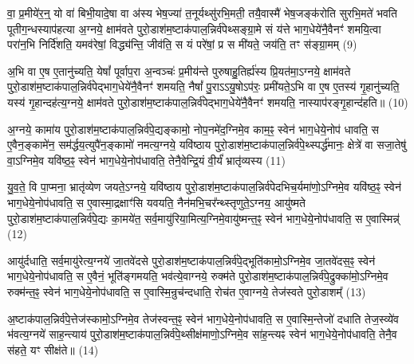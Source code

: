 वा॒ प्र॒मीये॑र॒न्॒ यो वा॑ बिभी॒यादे॒षा वा अ॑स्य भेष॒ज्या॑ त॒नूर्यथ्सु॑रभि॒मती॒ तयै॒वास्मै॑ भेष॒जङ्क॑रोति सुरभि॒मते॑ भवति पूतीग॒न्धस्याप॑हत्या अ॒ग्नये॒ क्षाम॑वते पुरो॒डाश॑म॒ष्टाक॑पाल॒न्निर्व॑पेथ्सङ्ग्रा॒मे सं य॑त्ते भाग॒धेये॑नै॒वैनꣳ॑ शमयि॒त्वा परा॑न॒भि निर्दि॑शति॒ यमव॑रेषां॒ विद्ध्य॑न्ति॒ जीव॑ति॒ स यं परे॑षां॒ प्र स मी॑यते॒ जय॑ति॒ तꣳ स॑ङ्ग्रा॒मम् (9)

अ॒भि वा ए॒ष ए॒तानु॑च्यति॒ येषां᳚ पूर्वाप॒रा अ॒न्वञ्चः॑ प्र॒मीय॑न्ते पुरुषाहु॒तिर्ह्य॑स्य प्रि॒यत॑मा॒\-ऽग्नये॒ क्षाम॑वते पुरो॒डाश॑म॒ष्टाक॑पाल॒न्निर्व॑पेद्भाग॒धेये॑नै॒वैनꣳ॑ शमयति॒ नैषां᳚ पु॒रा\-ऽ\-ऽयु॒षो\-ऽप॑रः॒ प्रमी॑यते॒\-ऽभि वा ए॒ष ए॒तस्य॑ गृ॒हानु॑च्यति॒ यस्य॑ गृ॒हान्दह॑त्य॒ग्नये॒ क्षाम॑वते पुरो॒डाश॑म॒ष्टाक॑पाल॒न्निर्व॑पेद्भाग॒धेये॑नै॒वैनꣳ॑ शमयति॒ नास्याप॑रङ्गृ॒हान्द॑हति॥ (10)

{\anuvakamend[{व्र॒तप॑तये॒ निशि॑ताया॒न्निर्व॑पे॒त्पुरु॑षाः सङ्ग्रा॒मन्न च॒त्वारि॑ च॥२॥}]}

अ॒ग्नये॒ कामा॑य पुरो॒डाश॑म॒ष्टाक॑पाल॒न्निर्व॑पे॒द्यङ्कामो॒ नोप॒नमे॑द॒ग्निमे॒व काम॒ꣴ॒ स्वेन॑ भाग॒धेये॒नोप॑ धावति॒ स ए॒वैन॒ङ्कामे॑न॒ सम॑र्द्धय॒त्युपै॑न॒ङ्कामो॑ नमत्य॒ग्नये॒ यवि॑ष्ठाय पुरो॒डाश॑म॒ष्टाक॑पाल॒न्निर्व॑पे॒थ्स्पर्द्ध॑मानः॒ क्षेत्रे॑ वा सजा॒तेषु॑ वा॒\-ऽग्निमे॒व यवि॑ष्ठ॒ꣴ॒ स्वेन॑ भाग॒धेये॒नोप॑धावति॒ तेनै॒वेन्द्रि॒यं वी॒र्यं॑ भ्रातृ॑व्यस्य (11)

यु॒व॒ते॒ वि पा॒प्मना॒ भ्रातृ॑व्येण जयते॒\-ऽग्नये॒ यवि॑ष्ठाय पुरो॒डाश॑म॒ष्टाक॑पाल॒न्निर्व॑पेदभिच॒र्यमा॑णो॒\-ऽग्निमे॒व यवि॑ष्ठ॒ꣴ॒ स्वेन॑ भाग॒धेये॒नोप॑धावति॒ स ए॒वास्मा॒द्रक्षाꣳ॑सि यवयति॒ नैन॑मभि॒चर᳚न्थ्स्तृणुते॒\-ऽग्नय॒ आयु॑ष्मते पुरो॒डाश॑म॒ष्टाक॑पाल॒न्निर्व॑पे॒द्यः का॒मये॑त॒ सर्व॒मायु॑रिया॒मित्य॒ग्निमे॒वायु॑ष्मन्त॒ꣴ॒ स्वेन॑ भाग॒धेये॒नोप॑धावति॒ स ए॒वास्मिन्न्॑ (12)

आयु॑र्दधाति॒ सर्व॒मायु॑रेत्य॒ग्नये॑ जा॒तवे॑दसे पुरो॒डाश॑म॒ष्टाक॑पाल॒न्निर्व॑पे॒द्भूति॑कामो॒\-ऽग्निमे॒व जा॒तवे॑दस॒ꣴ॒ स्वेन॑ भाग॒धेये॒नोप॑धावति॒ स ए॒वैनं॒ भूति॑ङ्गमयति॒ भव॑त्ये॒वाग्नये॒ रुक्म॑ते पुरो॒डाश॑म॒ष्टाक॑पाल॒न्निर्व॑पे॒द्रुक्का॑मो॒\-ऽग्निमे॒व रुक्म॑न्त॒ꣴ॒ स्वेन॑ भाग॒धेये॒नोप॑धावति॒ स ए॒वास्मि॒न्रुच॑न्दधाति॒ रोच॑त ए॒वाग्नये॒ तेज॑स्वते पुरो॒डाशम्᳚ (13)

अ॒ष्टाक॑पाल॒न्निर्व॑पे॒त्तेज॑स्कामो॒\-ऽग्निमे॒व तेज॑स्वन्त॒ꣴ॒ स्वेन॑ भाग॒धेये॒नोप॑धावति॒ स ए॒वास्मि॒न्तेजो॑ दधाति तेज॒स्व्ये॑व भ॑वत्य॒ग्नये॑ साह॒न्त्याय॑ पुरो॒डाश॑म॒ष्टाक॑पाल॒न्निर्व॑पे॒थ्सीक्ष॑माणो॒\-ऽग्निमे॒व सा॑ह॒न्त्यꣴ स्वेन॑ भाग॒धेये॒नोप॑धावति॒ तेनै॒व स॑हते॒ यꣳ सीक्ष॑ते॥ (14)

{\anuvakamend[{भ्रातृ॑व्यस्यास्मि॒न्तेज॑स्वते पुरो॒डाश॑म॒ष्टात्रिꣳ॑शच्च॥३॥}]}

